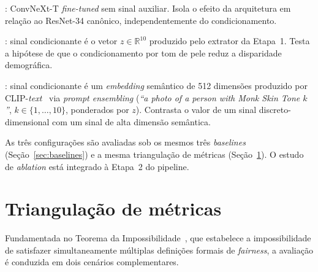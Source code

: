 \begin{description}[font=\bfseries\sffamily]
\item[Configuração A --- Controle arquitetural]: ConvNeXt-T \emph{fine-tuned} sem sinal auxiliar. Isola o efeito da arquitetura em relação ao ResNet-34 canônico, independentemente do condicionamento.

\item[Configuração B --- FiLM + MST (proposta principal)]: sinal condicionante é o vetor $z \in \mathbb{R}^{10}$ produzido pelo extrator da Etapa~1. Testa a hipótese de que o condicionamento por tom de pele reduz a disparidade demográfica.

\item[Configuração C --- FiLM + \emph{embedding} semântico]: sinal condicionante é um \emph{embedding} semântico de 512 dimensões produzido por CLIP-\emph{text}~\cite{luo2024fairclip} via \emph{prompt ensembling} (\emph{``a photo of a person with Monk Skin Tone $k$''}, $k \in \{1,\ldots,10\}$, ponderados por $z$). Contrasta o valor de um sinal discreto-dimensional com um sinal de alta dimensão semântica.
\end{description}

As três configurações são avaliadas sob os mesmos três \emph{baselines} (Seção~\ref{sec:baselines}) e a mesma triangulação de métricas (Seção~\ref{sec:metricas}). O estudo de \emph{ablation} está integrado à Etapa~2 do pipeline.

\section{Triangulação de métricas}
\label{sec:metricas}

Fundamentada no Teorema da Impossibilidade~\cite{kleinberg2017inherent}, que estabelece a impossibilidade de satisfazer simultaneamente múltiplas definições formais de \emph{fairness}, a avaliação é conduzida em dois cenários complementares.

